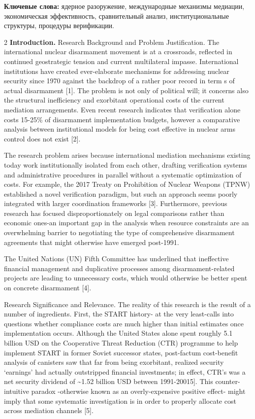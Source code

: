 {\bfseries Ключевые слова:} ядерное разоружение, международные механизмы
медиации, экономическая эффективность, сравнительный анализ,
институциональные структуры, процедуры верификации.

\begin{multicols}{2}
{\bfseries Introduction.} Research Background and Problem Justification.
The international nuclear disarmament movement is at a crossroads,
reflected in continued geostrategic tension and current multilateral
impasse. International institutions have created ever-elaborate
mechanisms for addressing nuclear security since 1970 against the
backdrop of a rather poor record in term s of actual disarmament
{[}1{]}. The problem is not only of political will; it concerns also the
structural inefficiency and exorbitant operational costs of the current
mediation arrangements. Even recent research indicates that verification
alone costs 15-25\% of disarmament implementation budgets, however a
comparative analysis between institutional models for being cost
effective in nuclear arms control does not exist {[}2{]}.

The research problem arises because international mediation mechanisms
existing today work institutionally isolated from each other, drafting
verification systems and administrative procedures in parallel without a
systematic optimization of costs. For example, the 2017 Treaty on
Prohibition of Nuclear Weapons (TPNW) established a novel verification
paradigm, but such an approach seems poorly integrated with larger
coordination frameworks {[}3{]}. Furthermore, previous research has
focused disproportionately on legal comparisons rather than economic
ones-an important gap in the analysis when resource constraints are an
overwhelming barrier to negotiating the type of comprehensive
disarmament agreements that might otherwise have emerged post-1991.

The United Nations (UN) Fifth Committee has underlined that ineffective
financial management and duplicative processes among disarmament-related
projects are leading to unnecessary costs, which would otherwise be
better spent on concrete disarmament {[}4{]}.

Research Significance and Relevance. The reality of this research is the
result of a number of ingredients. First, the START history- at the very
least-calls into questions whether compliance costs are much higher than
initial estimates once implementation occurs. Although the United States
alone spent roughly 5.1 billion USD on the Cooperative Threat Reduction
(CTR) programme to help implement START in former Soviet successor
states, post-factum cost-benefit analysis of canisters saw that far from
being exorbitant, realized security `earnings' had actually outstripped
financial investments; in effect, CTR's was a net security dividend of
\textasciitilde1.52 billion USD between 1991-20015{]}. This
counter-intuitive paradox -otherwise known as an overly-expensive
positive effect- might imply that some systematic investigation is in
order to properly allocate cost across mediation channels {[}5{]}.


\end{multicols}
